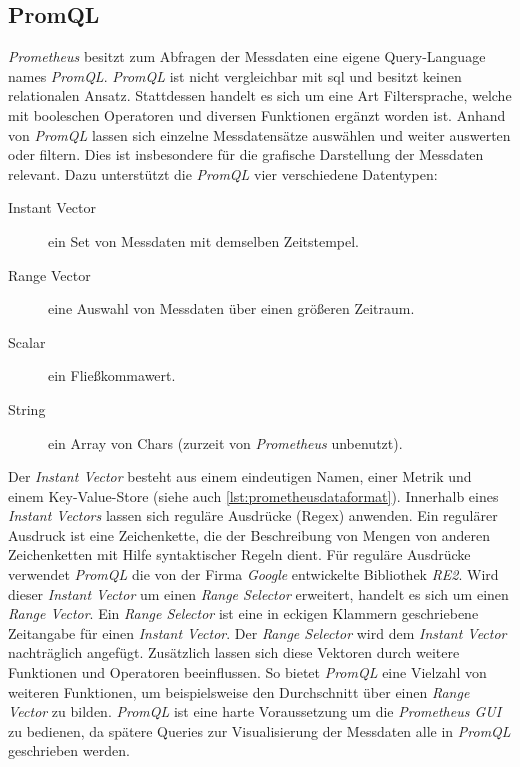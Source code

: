 \documentclass[titlepage]{report}
\begin{document}
\subsection{PromQL}
\emph{Prometheus} besitzt zum Abfragen der Messdaten eine eigene
Query\hyp{}Language names \emph{PromQL}. \emph{PromQL} ist nicht
vergleichbar mit \gls{sql} und besitzt keinen relationalen Ansatz.
Stattdessen handelt es sich um eine Art Filtersprache, welche mit
booleschen Operatoren und diversen Funktionen ergänzt worden ist.
Anhand von \emph{PromQL} lassen sich einzelne Messdatensätze auswählen
und weiter auswerten oder filtern\cite{PROMETHEUS_PROMQL}. Dies ist insbesondere für die
grafische Darstellung der Messdaten relevant. Dazu unterstützt die
\emph{PromQL} vier verschiedene Datentypen\cite{PROMETHEUS_PROMQL}:
\begin{description}
    \item[Instant Vector] ein Set von Messdaten mit demselben
        Zeitstempel.
    \item[Range Vector] eine Auswahl von Messdaten über einen größeren
        Zeitraum.
    \item[Scalar] ein Fließkommawert.
    \item[String] ein Array von Chars (zurzeit von \emph{Prometheus} unbenutzt).
\end{description}
Der \emph{Instant Vector} besteht aus einem eindeutigen Namen, einer Metrik und
einem Key\hyp{}Value\hyp{}Store (siehe auch
\autoref{lst:prometheusdataformat}). Innerhalb eines \emph{Instant Vectors}
lassen sich reguläre Ausdrücke (Regex) anwenden. Ein regulärer Ausdruck ist
eine Zeichenkette, die der Beschreibung von Mengen von anderen Zeichenketten
mit Hilfe syntaktischer Regeln dient\cite{REGEXWIKI}. Für reguläre Ausdrücke
verwendet \emph{PromQL} die von der Firma \emph{Google} entwickelte Bibliothek
\emph{RE2}\cite{RE2}. Wird dieser \emph{Instant Vector} um einen \emph{Range
Selector} erweitert, handelt es sich um einen \emph{Range Vector}. Ein
\emph{Range Selector} ist eine in eckigen Klammern geschriebene Zeitangabe für
einen \emph{Instant Vector}. Der \emph{Range Selector} wird dem \emph{Instant
Vector} nachträglich angefügt.  Zusätzlich lassen sich diese Vektoren durch
weitere Funktionen und Operatoren beeinflussen. So bietet \emph{PromQL} eine
Vielzahl von weiteren Funktionen, um beispielsweise den Durchschnitt über einen
\emph{Range Vector} zu bilden\cite{PROMETHEUS_PROMQL_FUNCTIONS}. \emph{PromQL}
ist eine harte Voraussetzung um die \emph{Prometheus GUI} zu bedienen, da
spätere Queries zur Visualisierung der Messdaten alle in \emph{PromQL}
geschrieben werden.
\end{document}
